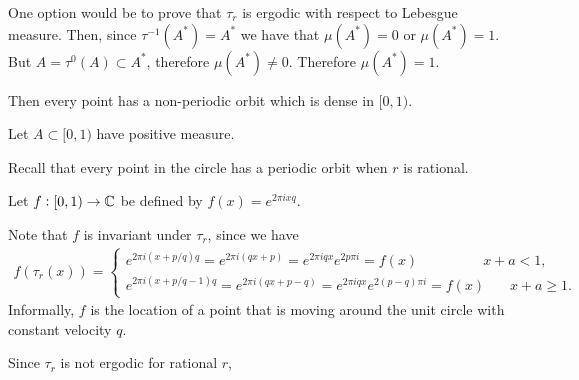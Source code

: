     One option would be to prove that $\tau_r$ is ergodic with respect to Lebesgue measure. Then,
    since $\tau^{-1}(A^*) = A^*$ we have that $\mu(A^*) = 0$ or $\mu(A^*) = 1$.
    But $A = \tau^0(A) \subset A^*$, therefore $\mu(A^*) \neq 0$. Therefore $\mu(A^*) = 1$.





    Then every point has a non-periodic orbit which is dense in $[0, 1)$.


    Let $A \subset [0, 1)$ have positive measure.


    Recall that every point in the circle has a periodic orbit when $r$ is rational.




    Let $f:[0, 1) \to \mathbb{C}$ be defined by $f(x) = e^{2\pi ixq}$.

    Note that $f$ is invariant under $\tau_r$, since we have
    \begin{align*}
      f(\tau_r(x)) =
      \begin{cases}
        e^{2\pi i (x + p/q)q} = e^{2\pi i (qx + p)} = e^{2\pi iqx}e^{2p\pi i} = f(x)  ~~~~~~~~~~~~~~~~~~~~~x + a < 1, \\
        e^{2\pi i (x + p/q - 1)q} = e^{2\pi i (qx + p - q)} = e^{2\pi iqx}e^{2(p - q)\pi i} = f(x)  ~~~~~~~~x + a \geq 1.
      \end{cases}
    \end{align*}
    Informally, $f$ is the location of a point that is moving around the unit circle with constant
    velocity $q$.

    Since $\tau_r$ is not ergodic for rational $r$,
